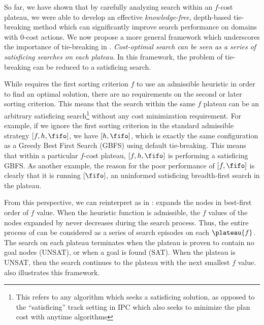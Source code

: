 

So far, we have shown that by carefully analyzing search within an $f$-cost plateau,
we were able to develop an effective
{\it knowledge-free}, depth-based tie-breaking method which can significantly improve search performance on domains with 0-cost actions.
We now propose a more general framework which underscores the importance of tie-breaking in \astar.
\emph{Cost-optimal search
can be seen as a series of satisficing searches on each plateau}. In this framework, the problem of tie-breaking can be
reduced to a satisficing search.


While \astar requires the first sorting criterion $f$ to use an admissible heuristic in order to find an optimal solution,
there are no requirements on the second or later sorting criterion.
This means that the search within the same $f$ plateau can be an arbitrary  satisficing search\footnote{This refers to any algorithm which seeks a satisficing solution, as opposed to the ``satisficing'' track setting in IPC which also seeks to minimize the plan cost with anytime algorithms} without any cost minimization requirement. For example,
if we ignore the first sorting criterion in the standard admissible strategy
$[f,h,\fifo]$, we have $[h,\fifo]$, which is exactly
the same configuration as a Greedy Best First Search (GBFS) using \fifo default tie-breaking. This 
means that within a particular $f$-cost plateau, $[f,h,\fifo]$ is
performing a satisficing GBFS.
As another example, the reason for the poor performance of $[f,\fifo]$
is clearly that it is running $[\fifo]$,
an uninformed satisficing breadth-first search in the plateau.

From this perspective, we can reinterpret \astar as in : \astar expands the nodes in best-first order of $f$ value. When the
heuristic function is admissible, the $f$ values of the nodes expanded by \astar never decreases during the
search process.
Thus, the entire process of \astar can be considered as a series of search episodes on each $\plateau{f}$.
The search on each plateau terminates when the plateau is proven to contain no goal nodes (UNSAT), or when a goal is found (SAT).
When the plateau is UNSAT, then the search continues to the plateau with the next smallest $f$ value.
 also illustrates this framework.

